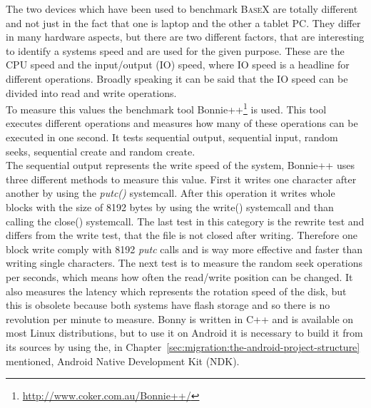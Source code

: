The two devices which have been used to benchmark \textsc{BaseX} are totally different and not just in the fact that one is laptop and the other a tablet PC.
They differ in many hardware aspects, but there are two different factors, that are interesting to identify a systems speed and are used for the given purpose.
These are the CPU speed and the input/output (IO) speed, where IO speed is a headline for different operations.
Broadly speaking it can be said that the IO speed can be divided into read and write operations.\\
To measure this values the benchmark tool Bonnie++\footnote{\url{http://www.coker.com.au/Bonnie++/}} is used.
This tool executes different operations and measures how many of these operations can be executed in one second.
It tests sequential output, sequential input, random seeks, sequential create and random create.\\
The sequential output represents the write speed of the system, Bonnie++ uses three different methods to measure this value.
First it writes one character after another by using the \textit{putc()} systemcall. 
After this operation it writes whole blocks with the size of 8192 bytes by using the write() systemcall and than calling the close() systemcall.
The last test in this category is the rewrite test and differs from the write test, that the file is not closed after writing.
Therefore one block write comply with 8192 \textit{putc} calls and is way more effective and faster than writing single characters.
The next test is to measure the random seek operations per seconds, which means how often the read/write position can be changed.
It also measures the latency which represents the rotation speed of the disk, but this is obsolete because both systems have flash storage and so there is no revolution per minute to measure.
Bonny is written in C++ and is available on most Linux distributions, but to use it on Android it is necessary to build it from its sources by using the, in Chapter~\ref{sec:migration:the-android-project-structure} mentioned, Android Native Development Kit (NDK).
